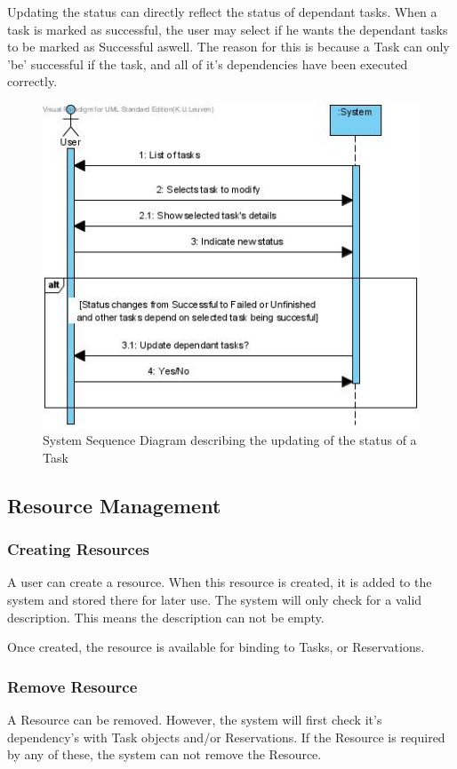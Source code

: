 \documentclass[a4paper,11pt]{article}
\begin{document}
			Updating the status can directly reflect the status of dependant tasks. When a task is marked as successful, the user may select if he wants the dependant tasks to be marked as Successful aswell.
			The reason for this is because a Task can only 'be' successful if the task, and all of it's dependencies have been executed correctly.
			\begin{figure}[h!]
				\begin{center}
					\includegraphics[scale=0.5]{images/ssd_update_task.jpg}
				\end{center}
				\caption{System Sequence Diagram describing the updating of the status of a Task}
			\end{figure}
		\subsection{Resource Management}
			\subsubsection{Creating Resources}
			A user can create a resource. When this resource is created, it is added to the system and stored there for later use.
			The system will only check for a valid description. This means the description can not be empty.

			Once created, the resource is available for binding to Tasks, or Reservations.
			\subsubsection{Remove Resource}
			A Resource can be removed. However, the system will first check it's dependency's with Task objects and/or Reservations.
			If the Resource is required by any of these, the system can not remove the Resource.
\end{document}
